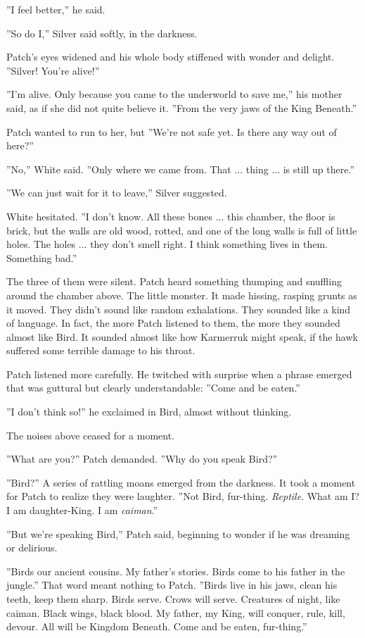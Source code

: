 \documentclass[11pt]{article}
\begin{document}
''I feel better,'' he said.\par
 ''So do I,'' Silver said softly, in the darkness.\par
 Patch's eyes widened and his whole body stiffened with wonder and delight. ''Silver! You're alive!''\par
 ''I'm alive. Only because you came to the underworld to save me,'' his mother said, as if she did not quite believe it. ''From the very jaws of the King Beneath.''\par
 Patch wanted to run to her, but %
 ''We're not safe yet. Is there any way out of here?''\par
 ''No,'' White said. ''Only where we came from. That ... thing ... is still up there.''\par
 ''We can just wait for it to leave,'' Silver suggested.\par
 White hesitated. ''I don't know. All these bones ... this chamber, the floor is brick, but the walls are old wood, rotted, and one of the long walls is full of little holes. The holes ... they don't smell right. I think something lives in them. Something bad.''\par
 The three of them were silent. Patch heard something thumping and snuffling around the chamber above. The little monster. It made hissing, rasping grunts as it moved. They didn't sound like random exhalations. They sounded like a kind of language. In fact, the more Patch listened to them, the more they sounded almost like Bird. It sounded almost like how Karmerruk might speak, if the hawk suffered some terrible damage to his throat.\par
Patch listened more carefully. He twitched with surprise when a phrase emerged that was guttural but clearly understandable: ''Come and be eaten.''\par
 ''I don't think so!'' he exclaimed in Bird, almost without thinking.\par
 The noises above ceased for a moment.\par
 ''What are you?'' Patch demanded. ''Why do you speak Bird?''\par
 ''Bird?'' A series of rattling moans emerged from the darkness. It took a moment for Patch to realize they were laughter. ''Not Bird, fur-thing. {\it Reptile}. What am I? I am daughter-King. I am {\it caiman}.''\par
 ''But we're speaking Bird,'' Patch said, beginning to wonder if he was dreaming or delirious.\par
 ''Birds our ancient cousins. My father's stories. Birds come to his father in the jungle.'' That word meant nothing to Patch. ''Birds live in his jaws, clean his teeth, keep them sharp. Birds serve. Crows will serve. Creatures of night, like caiman. Black wings, black blood. My father, my King, will conquer, rule, kill, devour. All will be Kingdom Beneath. Come and be eaten, fur-thing.''\par
\end{document}

